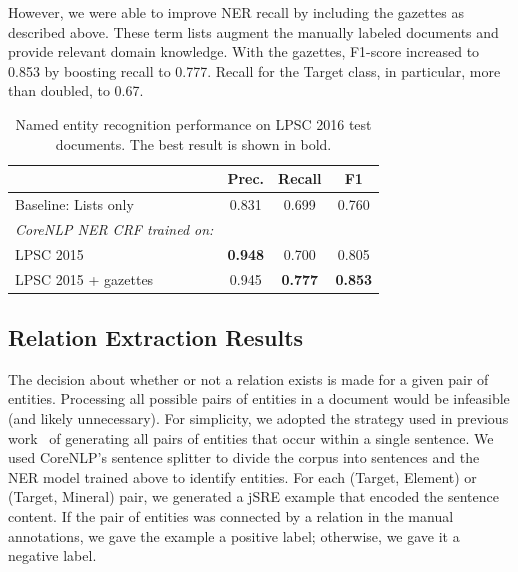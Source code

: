 \documentclass[letterpaper]{article} %
\begin{document}
However, we were able to improve NER recall by including the gazettes
as described above.  These term lists augment the manually labeled
documents and provide relevant domain knowledge.  With the gazettes,
F1-score increased to 0.853 by boosting recall to 0.777.  Recall for
the Target class, in particular, more than doubled, to 0.67.

\begin{table}
\caption{Named entity recognition performance on LPSC 2016 test documents.  
The best result is shown in bold.}
\label{tab:ner}
\begin{center}
\begin{tabular}{l|ccc}
 & Prec. & Recall & F1 \\ \hline
Baseline: Lists only & 0.831 & 0.699 & 0.760 \\ \hline  %
{\em CoreNLP NER CRF trained on:} & & \\
LPSC 2015            & {\bf 0.948} & 0.700 & 0.805 \\
LPSC 2015 + gazettes & 0.945 & {\bf 0.777} & {\bf 0.853} \\
\hline
\end{tabular}
\end{center}
\end{table}



\subsection{Relation Extraction Results}

The decision about whether or not a relation exists is made for a
given pair of entities.  Processing all possible pairs of entities in
a document would be infeasible (and likely unnecessary).  For
simplicity, we adopted the strategy used in previous
work~\cite{giuliano:jsre06} of generating all pairs of entities that
occur within a single sentence.  We used CoreNLP's sentence splitter
to divide the corpus into sentences and the NER model trained above to
identify entities.  For each (Target, Element) or (Target, Mineral)
pair, we generated a jSRE example that encoded the sentence content.
If the pair of entities was connected by a relation in the manual
annotations, we gave the example a positive label; otherwise, we gave
it a negative label.
\end{document}
